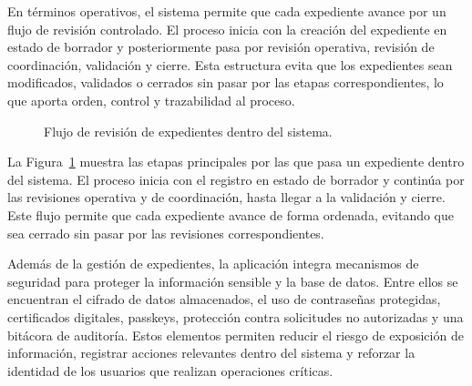 \documentclass[10pt, letterpaper]{article}
\begin{document}
En términos operativos, el sistema permite que cada expediente avance por un flujo de revisión controlado. El proceso inicia con la creación del expediente en estado de borrador y posteriormente pasa por revisión operativa, revisión de coordinación, validación y cierre. Esta estructura evita que los expedientes sean modificados, validados o cerrados sin pasar por las etapas correspondientes, lo que aporta orden, control y trazabilidad al proceso.

\begin{figure}[H]
\centering
{}
\caption{Flujo de revisión de expedientes dentro del sistema.}
\label{fig:flujo-expediente}
\end{figure}

La Figura~\ref{fig:flujo-expediente} muestra las etapas principales por las que pasa un expediente dentro del sistema. El proceso inicia con el registro en estado de borrador y continúa por las revisiones operativa y de coordinación, hasta llegar a la validación y cierre. Este flujo permite que cada expediente avance de forma ordenada, evitando que sea cerrado sin pasar por las revisiones correspondientes.

Además de la gestión de expedientes, la aplicación integra mecanismos de seguridad para proteger la información sensible y la base de datos. Entre ellos se encuentran el cifrado de datos almacenados, el uso de contraseñas protegidas, certificados digitales, passkeys, protección contra solicitudes no autorizadas y una bitácora de auditoría. Estos elementos permiten reducir el riesgo de exposición de información, registrar acciones relevantes dentro del sistema y reforzar la identidad de los usuarios que realizan operaciones críticas.
\end{document}
